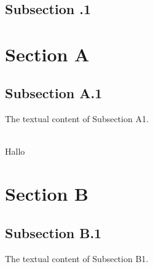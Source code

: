 \documentclass[12pt,draft,a4paper]{scrartcl}
\begin{document}
\tableofcontents
\newpage
\section{}
\subsection{Subsection .1}

\section{Section A}
\subsection{Subsection A.1}
{\huge

             
  The textual content of Subsection A1.
}\\
Hallo
\newpage
\section{Section B}
\subsection{Subsection B.1}
The textual content of Subsection B1.
\end{document}
